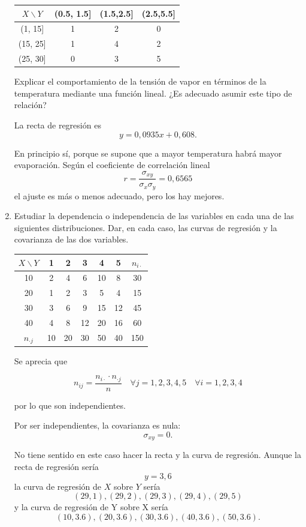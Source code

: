 \documentclass[10pt,a4paper]{article}
\begin{document}
\begin{enumerate}
\begin{center}
\begin{tabular}{c|ccc}
$X \backslash Y$ & (0.5, 1.5] & (1.5,2.5] & (2.5,5.5]\\\hline
(1, 15] & 1 & 2 & 0 \\
(15, 25] & 1 & 4 & 2 \\
(25, 30] & 0 & 3 & 5 \\
\end{tabular}
\end{center}

Explicar el comportamiento de la tensión de vapor en términos de la temperatura mediante una función lineal. ¿Es adecuado asumir este tipo de relación?

La recta de regresión es $$y = 0,0935x + 0,608.$$

En principio sí, porque se supone que a mayor temperatura habrá mayor evaporación.
Según el coeficiente de correlación lineal $$r = \frac{\sigma_{xy}}{\sigma_x\sigma_y} = 0,6565$$ el ajuste es más o menos adecuado, pero los hay mejores.

\newpage

\item Estudiar la dependencia o independencia de las variables en cada una de las siguientes distribuciones. Dar, en cada caso, las curvas de regresión y la covarianza de las dos variables.

\begin{center}
\begin{tabular}{c|ccccc|c}
$X \backslash Y$ & 1 & 2 & 3 & 4 & 5 & $n_{i\cdot}$\\\hline
10 & 2 & 4 & 6 & 10 & 8 & 30\\
20 & 1 & 2 & 3 & 5 & 4 & 15\\
30 & 3 & 6 & 9 & 15 & 12 & 45\\
40 & 4 & 8 & 12 & 20 & 16 & 60\\\hline
$n_{\cdot j}$ & 10 & 20 & 30 & 50 & 40 & 150\\
\end{tabular}
\end{center}

Se aprecia que 

$$n_{ij} = \frac{n_{i\cdot}\cdot n_{\cdot j}}{n} \quad \forall j = 1,2,3,4,5 \quad \forall i = 1,2,3,4$$ 

por lo que son independientes.

Por ser independientes, la covarianza es nula: $$\sigma_{xy} = 0.$$

No tiene sentido en este caso hacer la recta y la curva de regresión. Aunque la recta de regresión sería $$y = 3,6$$ la curva de regresión de $X$ sobre $Y$ sería $$(29, 1), (29, 2), (29, 3), (29, 4), (29, 5)$$ y la curva de regresión de Y sobre X sería $$(10, 3.6), (20, 3.6), (30, 3.6), (40, 3.6), (50,3.6).$$


\end{enumerate}
\end{document}
